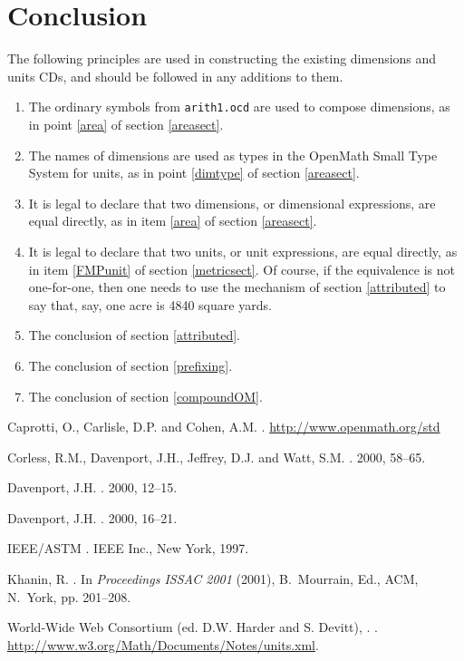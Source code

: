 \documentclass[11pt]{openmathTN}
\begin{document}
\section{Conclusion}
The following principles are used in constructing the existing dimensions
and units CDs, and should be followed in any additions to them.
\begin{enumerate}
\item The ordinary symbols from {\tt arith1.ocd} are used to compose
dimensions, as in point \ref{area} of section \ref{areasect}.
\item The names of dimensions are used as types in the OpenMath Small Type
System \cite{Davenport2000c} for units, as in point \ref{dimtype} of
section \ref{areasect}.
\item It is legal to declare that two dimensions, or dimensional
expressions, are equal directly, as in item \ref{area} of section
\ref{areasect}.
\item It is legal to declare that two units, or unit expressions, are equal
directly, as in item \ref{FMPunit} of section \ref{metricsect}. Of course,
if the equivalence is not one-for-one, then one needs to use the mechanism
of section \ref{attributed} to say that, say, one acre is 4840 square
yards.
\item The conclusion of section \ref{attributed}.
\item The conclusion of section \ref{prefixing}.
\item The conclusion of section \ref{compoundOM}.
\end{enumerate}
\begin{thebibliography}{9}
{\sc Caprotti, O., Carlisle, D.P. and Cohen, A.M.}
.
\newblock \url{http://www.openmath.org/std}

{\sc Corless, R.M., Davenport, J.H., Jeffrey, D.J. and Watt, S.M.}
.
 2000, 58--65.

{\sc Davenport, J.H.}
.
 2000, 12--15.

{\sc Davenport, J.H.}
.
 2000, 16--21.

{\sc IEEE/ASTM}
.
\newblock IEEE Inc., New York, 1997.

{\sc Khanin, R.}
.
\newblock In {\em Proceedings ISSAC 2001\/} (2001), B.~Mourrain, Ed., ACM,
N.~York, pp. 201--208.

{\sc World-Wide Web Consortium (ed. D.W. Harder and S. Devitt)},
.
.
\url{http://www.w3.org/Math/Documents/Notes/units.xml}.
\end{thebibliography}
\appendix
\end{document}
